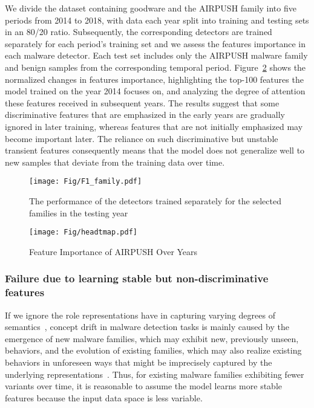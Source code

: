 We divide the dataset containing goodware and the AIRPUSH family into five periods from 2014 to 2018, with data each year split into training and testing sets in an 80/20 ratio. Subsequently, the corresponding detectors are trained separately for each period's training set and we assess the features importance in each malware detector. Each test set includes only the AIRPUSH malware family and benign samples from the corresponding temporal period. Figure~\ref{fig:heatmap} shows the normalized changes in features importance, highlighting the top-100 features the model trained on the year 2014 focuses on, and analyzing the degree of attention these features received in subsequent years. The results suggest that some discriminative features that are emphasized in the early years are gradually ignored in later training, whereas features that are not initially emphasized may become important later. The reliance on such discriminative but unstable transient features consequently means that the model does not generalize well to new samples that deviate from the training data over time. 


\begin{figure}
    \centering
    \setlength{\abovecaptionskip}{0.3cm}
    \texttt{[image: Fig/F1\_family.pdf]}
    \caption{The performance of the detectors trained separately for the selected families in the testing year}
    \label{fig:f1_family}
\end{figure}

\begin{figure}
    \centering
    \setlength{\abovecaptionskip}{0.cm}
    \texttt{[image: Fig/headtmap.pdf]}
    \caption{Feature Importance of AIRPUSH Over Years}
    \label{fig:heatmap}
\end{figure}

\subsubsection{Failure due to learning stable but non-discriminative features}
\label{discriminative features}
If we ignore the role representations have in capturing varying degrees of semantics~\cite{pei2024exploiting}, concept drift in malware detection tasks is mainly caused by the emergence of new malware families, which may exhibit new, previously unseen, behaviors, and the evolution of existing families, which may also realize existing behaviors in unforeseen ways that might be imprecisely captured by the underlying representations~\cite{pei2024exploiting}. Thus, for existing malware families exhibiting fewer variants over time, it is reasonable to assume the model learns more stable features because the input data space is less variable.

